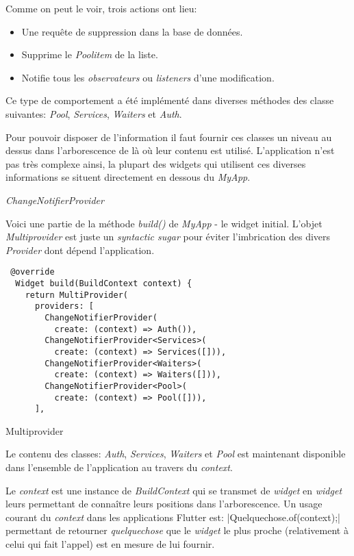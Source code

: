 Comme on peut le voir, trois actions ont lieu:
\smallskip
\begin{itemize}
    \item Une requête de suppression dans la base de données.
    \item Supprime le \textit{Poolitem} de la liste.
    \item Notifie tous les \textit{observateurs} ou \textit{listeners} d'une modification.
\end{itemize}
\smallskip
Ce type de comportement a été implémenté dans diverses méthodes des classe suivantes: \textit{Pool}, \textit{Services}, \textit{Waiters} et \textit{Auth}.

Pour pouvoir disposer de l'information il faut fournir ces classes un niveau au dessus dans l'arborescence de là où leur contenu est utilisé. L'application n'est pas très complexe ainsi, la plupart des widgets qui utilisent ces diverses informations se situent directement en dessous du \textit{MyApp}.

\emph{ChangeNotifierProvider}

Voici une partie de la méthode \textit{build()} de \textit{MyApp} - le widget initial.
L'objet \textit{Multiprovider} est juste un \textit{syntactic sugar} pour éviter l'imbrication des divers \textit{Provider} dont dépend l'application.
\begin{listing}[!h]
\begin{verbatim}
 @override
  Widget build(BuildContext context) {
    return MultiProvider(
      providers: [
        ChangeNotifierProvider(
          create: (context) => Auth()),
        ChangeNotifierProvider<Services>(
          create: (context) => Services([])),
        ChangeNotifierProvider<Waiters>(
          create: (context) => Waiters([])),
        ChangeNotifierProvider<Pool>(
          create: (context) => Pool([])),
      ],
\end{verbatim}
\caption{Multiprovider}
\label{code:multiprovider}
\end{listing}

Le contenu des classes: \textit{Auth}, \textit{Services}, \textit{Waiters} et \textit{Pool} est maintenant disponible dans l'ensemble de l'application au travers du \textit{context}.

Le \textit{context} est une instance de \textit{BuildContext} qui se transmet de \textit{widget} en \textit{widget} leurs permettant de connaître leurs positions dans l'arborescence. Un usage courant du \textit{context} dans les applications Flutter est: |Quelquechose.of(context);| permettant de retourner \textit{quelquechose} que le \textit{widget} le plus proche (relativement à celui qui fait l'appel) est en mesure de lui fournir.

